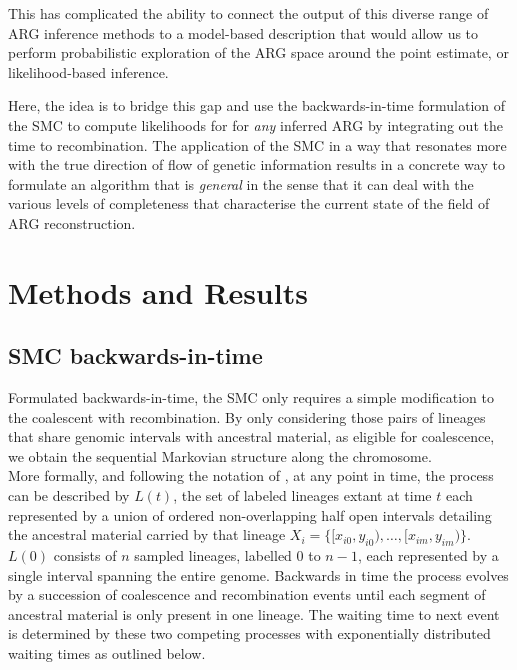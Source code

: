 \documentclass{article}
\begin{document}

This has complicated the ability to connect the output of this diverse range of 
ARG inference methods to a model-based description that would allow us to perform  
probabilistic exploration of the ARG space around the point estimate, 
or likelihood-based inference.

Here, the idea is to bridge this gap and use the backwards-in-time formulation of the SMC 
to compute likelihoods for for \textit{any} inferred ARG 
by integrating out the time to recombination.
The application of the SMC in a way that resonates more 
with the true direction of flow of genetic information 
results in a concrete way to formulate an algorithm 
that is \textit{general} in the sense that it can deal with the various levels of 
completeness that characterise the current state of the field of ARG reconstruction.


\section{Methods and Results}
\subsection{SMC backwards-in-time}\label{par:description}

Formulated backwards-in-time, the SMC \citep{mcvean_approximating_2005} only requires a 
simple modification to the 
coalescent with recombination. By only considering those pairs of 
lineages that share 
genomic intervals with ancestral material, as eligible for coalescence, we obtain the 
sequential Markovian structure along the chromosome.\\

More formally, and following the notation of \citet{mcvean_approximating_2005}, at any 
point in time, the process can be described by $L(t)$, the set of labeled lineages 
extant at time $t$ each represented by a union of ordered non-overlapping half open 
intervals detailing the ancestral material 
carried by that lineage $X_i = \{[x_{i0}, y_{i0}), \dotsc, [x_{im}, y_{im})\}$.
$L(0)$ consists of $n$ sampled lineages, labelled $0$ to $n-1$, each represented by a 
single interval spanning the entire genome.
Backwards in time the process evolves by a succession of coalescence and recombination 
events until each segment of ancestral material is only present in one lineage. 
The waiting time to next event is determined by these two competing processes 
with exponentially distributed waiting times as outlined below.\\
\end{document}
